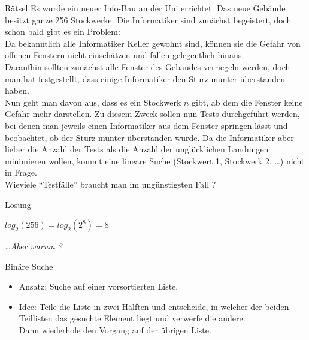 \documentclass[18pt]{beamer}
\newcommand{\quotes}[1]{``#1''}
\begin{document}
\begin{frame}{Rätsel}
    \small
    Es wurde ein neuer Info-Bau an der Uni errichtet. Das neue Gebäude besitzt ganze 256 Stockwerke.
    Die Informatiker sind zunächst begeistert, doch schon bald gibt es ein Problem:\\
    Da bekanntlich alle Informatiker Keller gewohnt sind, können sie die Gefahr von offenen Fenstern nicht einschätzen und fallen gelegentlich hinaus.\\
    Daraufhin sollten zunächst alle Fenster des Gebäudes verriegeln werden, doch man hat festgestellt, dass einige Informatiker den Sturz munter überstanden haben.\\
    Nun geht man davon aus, dass es ein Stockwerk $n$ gibt, ab dem die Fenster keine Gefahr mehr darstellen. Zu diesem Zweck sollen nun Tests durchgeführt werden,
    bei denen man jeweils einen Informatiker aus dem Fenster springen lässt und beobachtet, ob der Sturz munter überstanden wurde.
    Da die Informatiker aber lieber die Anzahl der Tests als die Anzahl der unglücklichen Landungen minimieren wollen, kommt eine lineare Suche (Stockwert 1, Stockwerk 2, \dots) nicht in Frage.\\
    \vspace{.2in}
    Wieviele \quotes{Testfälle} braucht man im ungünstigsten Fall ?
\end{frame}

\begin{frame}{Lösung}
    \begin{block}{}
        $log_2(256) = log_2(2^8) = 8$
    \end{block}
    \pause
    \vspace{.4in}
    \textit{\dots Aber warum ?}
\end{frame}


\begin{frame}{Binäre Suche}
    \begin{itemize}
        \item Ansatz: Suche auf einer vorsortierten Liste.
        \item Idee: Teile die Liste in zwei Hälften und entscheide, in welcher der beiden Teillisten das gesuchte Element liegt und verwerfe die andere.\\
        Dann wiederhole den Vorgang auf der übrigen Liste.
    \end{itemize}
\end{frame}
\end{document}
